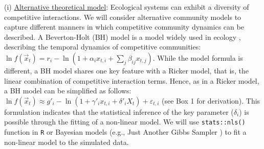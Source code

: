 \documentclass[12pt, class=article, crop=false]{standalone}
\begin{document}
(i) \ul{Alternative theoretical model}:
Ecological systems can exhibit a diversity of competitive interactions.
We will consider alternative community models to capture different manners in which competitive community dynamics can be described. 
A Beverton-Holt (BH) model is a model widely used in ecology \citep{otto_biologists_2011}, describing the temporal dynamics of competitive communities: $\ln f(\overset{\rightarrow}{x}_{t}) = r_i - \ln(1 + \alpha_i x_{t,i} + \sum_j \beta_{ij} x_{t,j})$. 
While the model formula is different, a BH model shares one key feature with a Ricker model, that is, the linear combination of competitive interaction terms.
Hence, as in a Ricker model, a BH model can be simplified as follows: $\ln f(\overset{\rightarrow}{x}_{t}) \approx g'_{i} - \ln(1 + \gamma'_i x_{t,i} + \delta'_i X_t) + \varepsilon_{t,i}$ (see Box 1 for derivation).
This formulation indicates that the statistical inference of the key parameter ($\delta_i$) is possible through the fitting of a non-linear model.
We will use \texttt{stats::nls()} function in \texttt{R} or Bayesian models (e.g., Just Another Gibbs Sampler \citep{plummer_jags_2003}) to fit a non-linear model to the simulated data.
\end{document}
